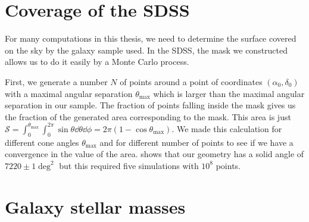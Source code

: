 \section{Coverage of the SDSS}

For many computations in this thesis, we need to determine the surface covered
on the sky by the galaxy sample used. In the SDSS, the mask we constructed
allows us to do it easily by a Monte Carlo process.

First, we generate a number $N$ of points around a point of coordinates
$(\alpha_0, \delta_0)$ with a maximal angular separation $\theta_{\max}$ which
is larger than the maximal angular separation in our sample. The fraction of
points falling inside the mask gives us the fraction of the generated area
corresponding to the mask. This area is just
$\mathcal{S}=\int_0^{\theta_{\max}}\int_0^{2\pi}\sin\theta\dd{\theta}\dd{\phi}=
2\pi\left(1-\cos\theta_{\max}\right)$. We made this calculation for different
cone angles $\theta_{\max}$ and for different number of points to see if we
have a convergence in the value of the area.  shows
that our geometry has a solid angle of $7220\pm1 \mathrm{\deg}^2$ but this
required five simulations with $10^8$ points.
%

\section{Galaxy stellar masses}

